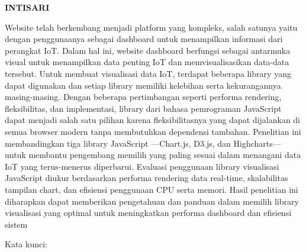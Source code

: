 \clearpage
{}
{}
\begin{center}
    \textbf{INTISARI}\\[0.5cm]
\end{center}

Website telah berkembang menjadi platform yang kompleks, salah satunya yaitu dengan penggunaanya sebagai dashboard untuk menampilkan informasi dari perangkat IoT. Dalam hal ini, website dashboard berfungsi sebagai antarmuka visual untuk menampilkan data penting IoT dan memvisualisasikan data-data tersebut. Untuk membuat visualisasi data IoT, terdapat beberapa library yang dapat digunakan dan setiap library memiliki kelebihan serta kekurangannya masing-masing. Dengan beberapa pertimbangan seperti performa rendering, fleksibilitas, dan implementasi, library dari bahasa pemrograman JavaScript dapat menjadi salah satu pilihan karena fleksibilitasnya yang dapat dijalankan di semua browser modern tanpa membutuhkan dependensi tambahan. Penelitian ini membandingkan tiga library JavaScript —Chart.js, D3.js, dan Highcharts— untuk membantu pengembang memilih yang paling sesuai dalam menangani data IoT yang terus-menerus diperbarui. Evaluasi penggunaan library visualisasi JavaScript diukur berdasarkan performa rendering data real-time, skalabilitas tampilan chart, dan efisiensi penggunaan CPU serta memori. Hasil penelitian ini diharapkan dapat memberikan pengetahuan dan panduan dalam memilih library visualisasi yang optimal untuk meningkatkan performa dashboard dan efisiensi sistem

\noindent Kata kunci: \katakunci